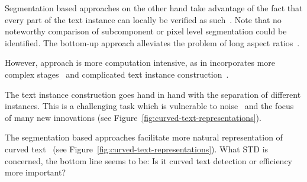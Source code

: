 Segmentation based approaches on the other hand take advantage of the fact that every part of the
text instance can locally be verified as such~\citep{long_scene_2021}.
Note that no noteworthy comparison of subcomponent or pixel level segmentation could be identified.
The bottom-up approach alleviates the problem of long aspect ratios~\citep{shi_detecting_2017}.

However, approach is more computation intensive, as in incorporates more complex
stages~\citep{dai_fused_2018} and complicated text instance
construction~\citep{xie_aggregation_2019,liao_real-time_2019,dai_fused_2018}.

The text instance construction goes hand in hand with the separation of different instances.
This is a challenging task which is vulnerable to noise~\citep{long_scene_2021} and the focus of
many new innovations (see Figure~\ref{fig:curved-text-representations}).

The segmentation based approaches facilitate more natural representation of curved
text~\citep{dai_fused_2018,long_scene_2021} (see Figure~\ref{fig:curved-text-representations}).
What \ac{STD} is concerned, the bottom line seems to be: Is it curved text detection or efficiency
more important?

